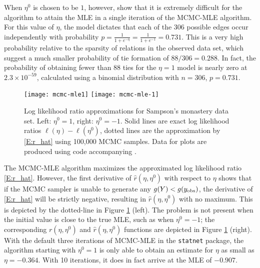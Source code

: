 When $\eta^0$ is chosen to be $1$, however, \citeauthor{ergm} show that it is
extremely difficult for the algorithm to attain the MLE in a single iteration of 
the MCMC-MLE algorithm.  
For this value of $\eta$, the model dictates that each of the 306 possible edges occur independently with probability $p = \frac{1}{1+e^{-\eta}} = \frac{1}{1+e^{-1}} = 0.731$.   
This is a very high probability relative to the sparsity of relations in the observed data 
set, which suggest a much smaller probability of tie formation of $88/306= 0.288$.  
In fact, the probability of obtaining fewer than 88 ties for the $\eta=1$ model is nearly zero at $2.3 \times 10^{-59}$, calculated using a binomial distribution with $n=306$, $p =0.731$.  

\begin{figure}[h]  
\begin{center} 
{\texttt{[image: mcmc-mle1]}}
{\texttt{[image: mcmc-mle-1]}}
\end{center} 
\caption[Log likelihood ratio approximations for Sampson's monastery data set]{Log likelihood ratio approximations for Sampson's monastery data set.  Left: $\eta^0 = 1$, right: $\eta^0 = -1$. Solid lines are exact log likelihood ratios $\ell(\eta) - \ell(\eta^0)$, dotted lines are the 
approximation by \eqref{E:r_hat} using 100,000 MCMC samples.  Data for plots are produced using code accompanying \citet{Hummel}.} 
\label{F:MCMC-MLE}
\end{figure} 

The MCMC-MLE algorithm maximizes the approximated log 
likelihood ratio \eqref{E:r_hat}.  However, the first derivative of $\hat{r}(\eta,\eta^0)$ with respect
to $\eta$ shows that if the MCMC sampler is unable to generate any $g(Y)< g(y_{\text{obs}})$, 
the derivative of 
\eqref{E:r_hat} will be strictly negative, resulting in $\hat{r}(\eta,\eta^0)$ with no
maximum.  This is depicted by the dotted-line in Figure \ref{F:MCMC-MLE} (left).  
The problem is not present when the initial value is close to the true MLE, such as 
when $\eta^0 = -1$; the corresponding $r(\eta,\eta^0)$ and $\hat{r}(\eta,\eta^0)$ 
functions are depicted in Figure \ref{F:MCMC-MLE} (right).  With the default three 
iterations of MCMC-MLE in the \texttt{statnet} package, the algorithm 
starting with $\eta^0 = 1$ is only able to obtain an estimate for $\eta$ as 
small as $\eta = -0.364$.  With 10 iterations, it does in fact 
arrive at the MLE of $-0.907$.
 
